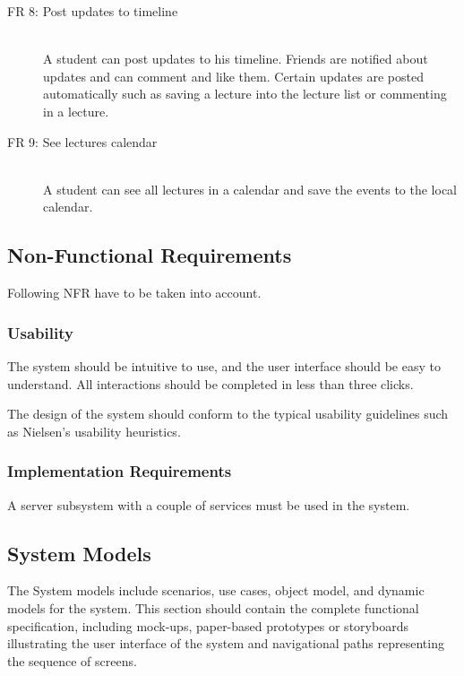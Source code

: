 \documentclass[a4paper,12pt,halfparskip]{scrartcl}
\newenvironment{subs}
{\adjustwidth{3em}{0pt}}
{\endadjustwidth}
\newenvironment{subsubs}
{\adjustwidth{2em}{0pt}}
{\endadjustwidth}
\begin{document}
\begin{subs}
\begin{description}
            \item[FR 8: Post updates to timeline] \hfill \\ A student can post updates to his timeline. Friends are
            notified about updates and can comment and like them. Certain updates are posted
            automatically such as saving a lecture into the lecture list or commenting in a lecture.

            \item[FR 9: See lectures calendar] \hfill \\ A student can see all lectures in a calendar and save the
            events to the local calendar.
        \end{description}

        \subsection{Non-Functional Requirements}
        Following NFR have to be taken into account.

        \begin{subsubs}
            \subsubsection{Usability}
            The system should be intuitive to use, and the user interface should be easy to understand.
            All interactions should be completed in less than three clicks.

            The design of the system should conform to the typical usability guidelines such as Nielsen’s usability heuristics.

            \subsubsection{Implementation Requirements}
            A server subsystem with a couple of services must be used in the system.
        \end{subsubs}

        \subsection{System Models}
        The System models include scenarios, use cases, object model, and dynamic models for the system. This section should contain the complete functional specification, including mock-ups, paper-based prototypes or storyboards illustrating the user interface of the system and navigational paths representing the sequence of screens.
        \begin{subsubs}

\end{subsubs}
\end{subs}
\end{document}
